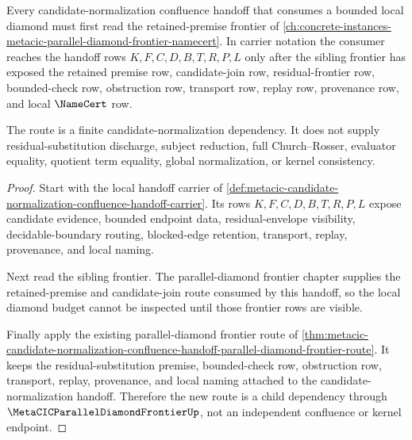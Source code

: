 \begin{theorem}
\label{thm:metacic-candidate-normalization-confluence-handoff-parallel-frontier-candidate-route}
Every candidate-normalization confluence handoff that consumes a bounded local diamond must first read the retained-premise frontier of \autoref{ch:concrete-instances-metacic-parallel-diamond-frontier-namecert}. In carrier notation the consumer reaches the handoff rows $K,F,C,D,B,T,R,P,L$ only after the sibling frontier has exposed the retained premise row, candidate-join row, residual-frontier row, bounded-check row, obstruction row, transport row, replay row, provenance row, and local $\NameCert$ row.

The route is a finite candidate-normalization dependency. It does not supply residual-substitution discharge, subject reduction, full Church--Rosser, evaluator equality, quotient term equality, global normalization, or kernel consistency.
\end{theorem}
\begin{proof}
Start with the local handoff carrier of \autoref{def:metacic-candidate-normalization-confluence-handoff-carrier}. Its rows $K,F,C,D,B,T,R,P,L$ expose candidate evidence, bounded endpoint data, residual-envelope visibility, decidable-boundary routing, blocked-edge retention, transport, replay, provenance, and local naming.

Next read the sibling frontier. The parallel-diamond frontier chapter supplies the retained-premise and candidate-join route consumed by this handoff, so the local diamond budget cannot be inspected until those frontier rows are visible.

Finally apply the existing parallel-diamond frontier route of \autoref{thm:metacic-candidate-normalization-confluence-handoff-parallel-diamond-frontier-route}. It keeps the residual-substitution premise, bounded-check row, obstruction row, transport, replay, provenance, and local naming attached to the candidate-normalization handoff. Therefore the new route is a child dependency through $\MetaCICParallelDiamondFrontierUp$, not an independent confluence or kernel endpoint.
\end{proof}

